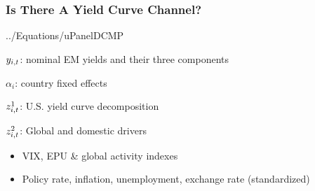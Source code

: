 \documentclass[12pt, aspectratio=169, xcolor=dvipsnames]{beamer}
\begin{document}
\begin{frame}
\frametitle{Is There A Yield Curve Channel?}
 {../Equations/uPanelDCMP}

\(y_{i,t}\): nominal EM yields and their three components

\(\alpha_{i}\): country fixed effects

\(z^{1}_{i,t}\): U.S. yield curve decomposition \citep{KimWright:2005}

\(z^{2}_{i,t}\): Global and domestic drivers
\begin{itemize}
	\item VIX, EPU \citep{BakerBloomDavis:2016} \& global activity  \citep{Hamilton:2019} indexes
	\item Policy rate, inflation, unemployment, exchange rate (standardized) %
\end{itemize}
\end{frame}
\end{document}
